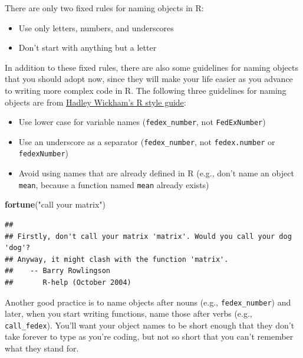 \documentclass[]{book}
\makeatletter
\newenvironment{Shaded}{\begin{snugshade}}{\end{snugshade}}
\newcommand{\KeywordTok}[1]{\textcolor[rgb]{0.13,0.29,0.53}{\textbf{#1}}}
\newcommand{\StringTok}[1]{\textcolor[rgb]{0.31,0.60,0.02}{#1}}
\newcommand{\NormalTok}[1]{#1}
\providecommand{\tightlist}{%
  \setlength{\itemsep}{0pt}\setlength{\parskip}{0pt}}
\newenvironment{kframe}{%
\medskip{}
\setlength{\fboxsep}{.8em}
 \def\at@end@of@kframe{}%
 \ifinner\ifhmode%
  \def\at@end@of@kframe{\end{minipage}}%
  \begin{minipage}{\columnwidth}%
 \fi\fi%
 \def\FrameCommand##1{\hskip\@totalleftmargin \hskip-\fboxsep
 \colorbox{shadecolor}{##1}\hskip-\fboxsep
     \hskip-\linewidth \hskip-\@totalleftmargin \hskip\columnwidth}%
 \MakeFramed {\advance\hsize-\width
   \@totalleftmargin\z@ \linewidth\hsize
   \@setminipage}}%
 {\par\unskip\endMakeFramed%
 \at@end@of@kframe}
\renewenvironment{Shaded}{\begin{kframe}}{\end{kframe}}
\theoremstyle{definition}
\theoremstyle{definition}
\theoremstyle{definition}
\theoremstyle{remark}
\makeatother
\begin{document}
There are only two fixed rules for naming objects in R:

\begin{itemize}
\tightlist
\item
  Use only letters, numbers, and underscores
\item
  Don't start with anything but a letter
\end{itemize}

In addition to these fixed rules, there are also some guidelines for
naming objects that you should adopt now, since they will make your life
easier as you advance to writing more complex code in R. The following
three guidelines for naming objects are from
\href{http://adv-r.had.co.nz/Style.html}{Hadley Wickham's R style
guide}:

\begin{itemize}
\tightlist
\item
  Use lower case for variable names (\texttt{fedex\_number}, not
  \texttt{FedExNumber})
\item
  Use an underscore as a separator (\texttt{fedex\_number}, not
  \texttt{fedex.number} or \texttt{fedexNumber})
\item
  Avoid using names that are already defined in R (e.g., don't name an
  object \texttt{mean}, because a function named \texttt{mean} already
  exists)
\end{itemize}

\begin{Shaded}
\begin{Highlighting}[]
\KeywordTok{fortune}\NormalTok{(}\StringTok{"call your matrix"}\NormalTok{)}
\end{Highlighting}
\end{Shaded}

\begin{verbatim}
## 
## Firstly, don't call your matrix 'matrix'. Would you call your dog 'dog'?
## Anyway, it might clash with the function 'matrix'.
##    -- Barry Rowlingson
##       R-help (October 2004)
\end{verbatim}

Another good practice is to name objects after nouns (e.g.,
\texttt{fedex\_number}) and later, when you start writing functions,
name those after verbs (e.g., \texttt{call\_fedex}). You'll want your
object names to be short enough that they don't take forever to type as
you're coding, but not so short that you can't remember what they stand
for.
\end{document}
